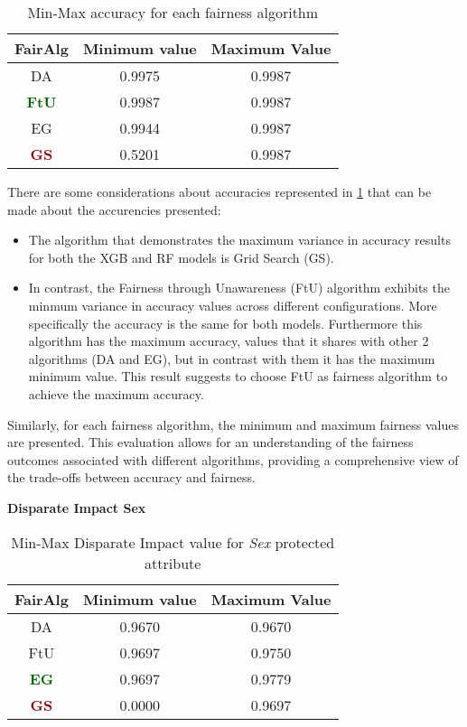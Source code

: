 \begin{table}
    \centering
    \begin{tabular}{|c|c|c|}
        \hline
        \textbf{FairAlg} & \textbf{Minimum value} & \textbf{Maximum Value} \\
        \hline
        DA & 0.9975 & 0.9987 \\
        \hline
        \textcolor{darkgreen}{\textbf{FtU}} & 0.9987 & 0.9987 \\
        \hline
        EG & 0.9944 & 0.9987 \\
        \hline
        \textcolor{darkred}{\textbf{GS}} & 0.5201 & 0.9987 \\
        \hline
    \end{tabular}
    \caption{Min-Max accuracy for each fairness algorithm}
    \label{tab:accuracies}
\end{table}

There are some considerations about accuracies represented in \cref{tab:accuracies} that can be made about the accurencies presented:
\begin{itemize}

    \item The algorithm that demonstrates the maximum variance in accuracy results for both the XGB and RF models is Grid Search (GS).

    \item In contrast, the Fairness through Unawareness (FtU) algorithm exhibits the minmum variance in accuracy values across different configurations. More specifically the accuracy is the same for both models. Furthermore this algorithm has the maximum accuracy, values that it shares with other 2 algorithms (DA and EG), but in contrast with them it has the maximum minimum value. This result suggests to choose FtU as fairness algorithm to achieve the maximum accuracy.
\end{itemize}

Similarly, for each fairness algorithm, the minimum and maximum fairness values are presented. This evaluation allows for an understanding of the fairness outcomes associated with different algorithms, providing a comprehensive view of the trade-offs between accuracy and fairness.

\textbf{Disparate Impact Sex}
\begin{table}
    \centering
    \begin{tabular}{|c|c|c|}
        \hline
        \textbf{FairAlg} & \textbf{Minimum value} & \textbf{Maximum Value} \\
        \hline
        DA & 0.9670 & 0.9670 \\
        \hline
        FtU & 0.9697 & 0.9750 \\
        \hline
        \textcolor{darkgreen}{\textbf{EG}} & 0.9697 & 0.9779 \\
        \hline
        \textcolor{darkred}{\textbf{GS}} & 0.0000 & 0.9697 \\
        \hline
    \end{tabular}
    \caption{Min-Max Disparate Impact value for \emph{Sex} protected attribute}
    \label{tab:s_di}
\end{table}

